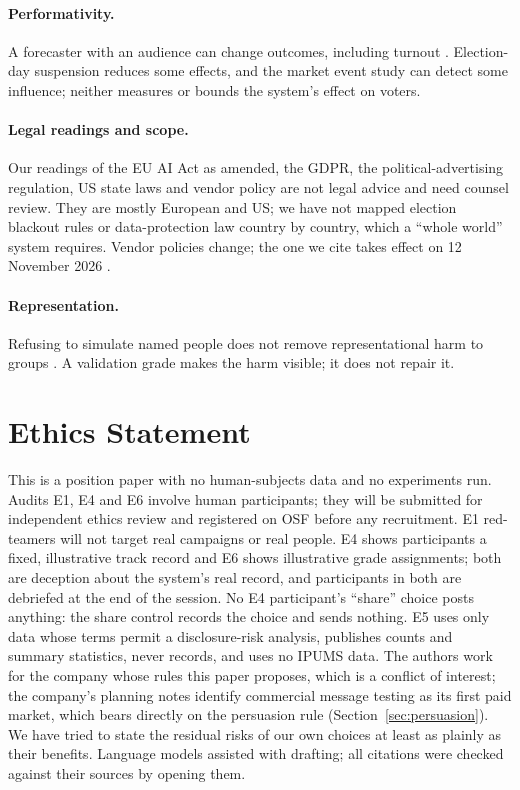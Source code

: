 \documentclass[11pt]{article}
\begin{document}
\paragraph{Performativity.} A forecaster with an audience can change outcomes, including turnout \citep{perdomo2020performative,westwood2020projecting,simon1954bandwagon}. Election-day suspension reduces some effects, and the market event study can detect some influence; neither measures or bounds the system's effect on voters.

\paragraph{Legal readings and scope.} Our readings of the EU AI Act as amended, the GDPR, the political-advertising regulation, US state laws and vendor policy are not legal advice and need counsel review. They are mostly European and US; we have not mapped election blackout rules or data-protection law country by country, which a ``whole world'' system requires. Vendor policies change; the one we cite takes effect on 12 November 2026 \citep{anthropic2026aup}.

\paragraph{Representation.} Refusing to simulate named people does not remove representational harm to groups \citep{wang2024misportray,agnew2024illusion}. A validation grade makes the harm visible; it does not repair it.

\section{Ethics Statement}

This is a position paper with no human-subjects data and no experiments run. Audits E1, E4 and E6 involve human participants; they will be submitted for independent ethics review and registered on OSF before any recruitment. E1 red-teamers will not target real campaigns or real people. E4 shows participants a fixed, illustrative track record and E6 shows illustrative grade assignments; both are deception about the system's real record, and participants in both are debriefed at the end of the session. No E4 participant's ``share'' choice posts anything: the share control records the choice and sends nothing. E5 uses only data whose terms permit a disclosure-risk analysis, publishes counts and summary statistics, never records, and uses no IPUMS data. The authors work for the company whose rules this paper proposes, which is a conflict of interest; the company's planning notes identify commercial message testing as its first paid market, which bears directly on the persuasion rule (Section~\ref{sec:persuasion}). We have tried to state the residual risks of our own choices at least as plainly as their benefits. Language models assisted with drafting; all citations were checked against their sources by opening them.
\end{document}
